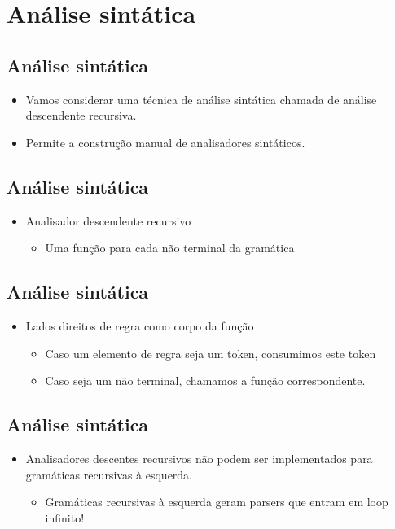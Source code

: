 \documentclass[11pt]{article}
\begin{document}
\section*{Análise sintática}
\label{sec:orgc3f7c99}

\subsection*{Análise sintática}
\label{sec:orgf66db25}

\begin{itemize}
\item Vamos considerar uma técnica de análise sintática chamada de análise descendente recursiva.
\item Permite a construção manual de analisadores sintáticos.
\end{itemize}
\subsection*{Análise sintática}
\label{sec:org78b1811}

\begin{itemize}
\item Analisador descendente recursivo 
\begin{itemize}
\item Uma função para cada não terminal da gramática
\end{itemize}
\end{itemize}
\subsection*{Análise sintática}
\label{sec:orgfe10ea9}

\begin{itemize}
\item Lados direitos de regra como corpo da função 
\begin{itemize}
\item Caso um elemento de regra seja um token, consumimos este token
\item Caso seja um não terminal, chamamos a função correspondente.
\end{itemize}
\end{itemize}
\subsection*{Análise sintática}
\label{sec:orgd6f6fe5}

\begin{itemize}
\item Analisadores descentes recursivos não podem ser implementados para gramáticas recursivas à esquerda.
\begin{itemize}
\item Gramáticas recursivas à esquerda geram parsers que entram em loop infinito!
\end{itemize}
\end{itemize}
\end{document}
